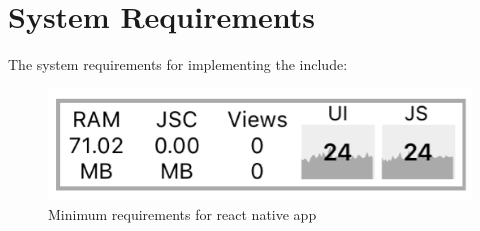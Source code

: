 \section{System Requirements}

The system requirements for implementing the {\myprojectname} include:

\begin{figure}
    \centering
    \includegraphics[width=0.90\linewidth]{Media//minreq.png}
    \caption{Minimum requirements for react native app}
    \label{fig:Minimum requirements for react native app}
\end{figure}

